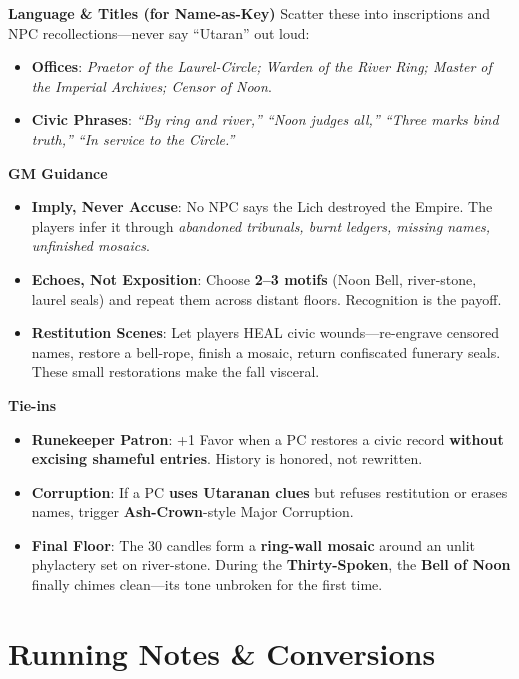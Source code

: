 \documentclass[18pt, letterpaper, twoside]{article}
\begin{document}
\begin{enumerate}
\textbf{Language \& Titles (for Name-as-Key)}
Scatter these into inscriptions and NPC recollections---never say ``Utaran'' out loud:
\begin{itemize}
    \item \textbf{Offices}: \textit{Praetor of the Laurel-Circle; Warden of the River Ring; Master of the Imperial Archives; Censor of Noon}.
    \item \textbf{Civic Phrases}: \textit{``By ring and river,'' ``Noon judges all,'' ``Three marks bind truth,'' ``In service to the Circle.''}
\end{itemize}

\textbf{GM Guidance}
\begin{itemize}
    \item \textbf{Imply, Never Accuse}: No NPC says the Lich destroyed the Empire. The players infer it through \textit{abandoned tribunals, burnt ledgers, missing names, unfinished mosaics}.
    \item \textbf{Echoes, Not Exposition}: Choose \textbf{2--3 motifs} (Noon Bell, river-stone, laurel seals) and repeat them across distant floors. Recognition is the payoff.
    \item \textbf{Restitution Scenes}: Let players HEAL civic wounds---re-engrave censored names, restore a bell-rope, finish a mosaic, return confiscated funerary seals. These small restorations make the fall visceral.
\end{itemize}

\textbf{Tie-ins}
\begin{itemize}
    \item \textbf{Runekeeper Patron}: +1 Favor when a PC restores a civic record \textbf{without excising shameful entries}. History is honored, not rewritten.
    \item \textbf{Corruption}: If a PC \textbf{uses Utaranan clues} but refuses restitution or erases names, trigger \textbf{Ash-Crown}-style Major Corruption.
    \item \textbf{Final Floor}: The 30 candles form a \textbf{ring-wall mosaic} around an unlit phylactery set on river-stone. During the \textbf{Thirty-Spoken}, the \textbf{Bell of Noon} finally chimes clean---its tone unbroken for the first time.
\end{itemize}

\section{Running Notes \& Conversions}
\label{sec:running-notes}

\end{enumerate}
\end{document}
